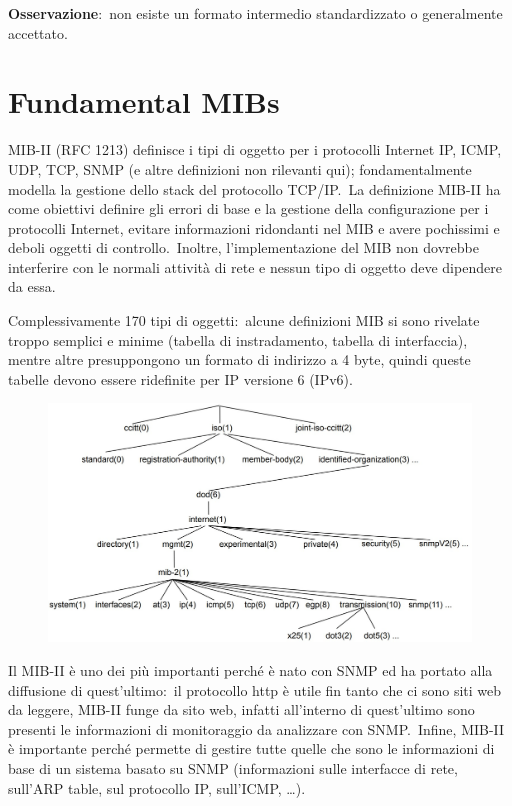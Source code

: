 \textbf{Osservazione}:\ non esiste un formato intermedio standardizzato o generalmente accettato.

\section{Fundamental MIBs}

MIB-II (RFC 1213) definisce i tipi di oggetto per i protocolli Internet IP, ICMP, UDP, TCP, SNMP (e altre definizioni non rilevanti qui); fondamentalmente modella la gestione dello stack del protocollo TCP/IP.\
La definizione MIB-II ha come obiettivi definire gli errori di base e la gestione della configurazione per i protocolli Internet, evitare informazioni ridondanti nel MIB e avere pochissimi e deboli oggetti di controllo.\
Inoltre, l'implementazione del MIB non dovrebbe interferire con le normali attività di rete e nessun tipo di oggetto deve dipendere da essa.

Complessivamente 170 tipi di oggetti:\ alcune definizioni MIB si sono rivelate troppo semplici e minime (tabella di instradamento, tabella di interfaccia), mentre altre presuppongono un formato di indirizzo a 4 byte, quindi queste tabelle devono essere ridefinite per IP versione 6 (IPv6).

\begin{figure}[H]
    \centering
    \includegraphics[width=\textwidth]{immagini/StructureMIBII.jpg}
\end{figure}

\noindent Il MIB-II è uno dei più importanti perché è nato con SNMP ed ha portato alla diffusione di quest'ultimo:\ il protocollo http è utile fin tanto che ci sono siti web da leggere, MIB-II funge da sito web, infatti all'interno di quest'ultimo sono presenti le informazioni di monitoraggio da analizzare con SNMP.\
Infine, MIB-II è importante perché permette di gestire tutte quelle che sono le informazioni di base di un sistema basato su SNMP (informazioni sulle interfacce di rete, sull'ARP table, sul protocollo IP, sull'ICMP, \dots).

